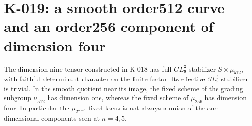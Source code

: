 \section{K-019: a smooth order512 curve and an order256 component of dimension four}

\begin{proposition}[K-019]
The dimension-nine tensor constructed in K-018 has full
$GL_9^3$ stabilizer $S\times\mu_{512}$, with faithful determinant
character on the finite factor.  Its effective $SL_9^3$ stabilizer
is trivial.  In the smooth quotient near its image, the fixed
scheme of the grading subgroup $\mu_{512}$ has dimension one,
whereas the fixed scheme of $\mu_{256}$ has dimension four.
In particular the $\mu_{2^{n-1}}$ fixed locus is not always a
union of the one-dimensional components seen at $n=4,5$.
\end{proposition}

